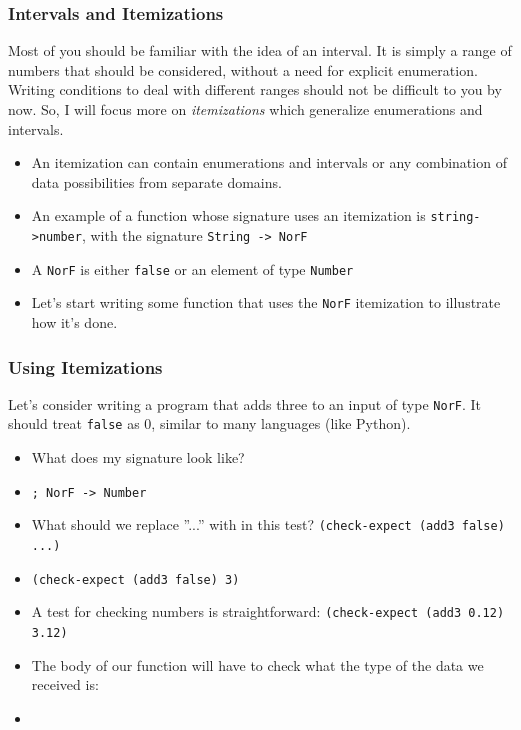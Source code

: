 \documentclass{beamer}
\begin{document}
\begin{frame}
  \frametitle{Intervals and Itemizations}
  Most of you should be familiar with the idea of an interval. It is simply
  a range of numbers that should be considered, without a need for
  explicit enumeration.
  Writing conditions to deal
  with different ranges should not be difficult to you by now. So, I will
  focus more on \emph{itemizations} which generalize enumerations and intervals.
  \begin{itemize}
  \item<2-> An itemization can contain enumerations and intervals or any
    combination of data possibilities from separate domains.
  \item<3-> An example of a function whose signature uses an
    itemization is \texttt{string->number}, with
    the signature \texttt{String -> NorF}
  \item<4-> A \texttt{NorF} is either \texttt{false}
    or an element of type \texttt{Number}
  \item<5-> Let's start writing some function that uses the \texttt{NorF} itemization to illustrate how it's done.
  \end{itemize}
\end{frame}



\begin{frame}
  \frametitle{Using Itemizations}
  Let's consider writing a program that adds three to an input
  of type \texttt{NorF}. It should treat \texttt{false}
  as 0, similar to many languages (like Python).
  \begin{itemize}
  \item<2-> What does my signature look like?
  \item<3-> \texttt{; NorF -> Number}
  \item<4-> What should we replace ''...'' with in this test?
    \texttt{(check-expect (add3 false) ...)}
  \item<5-> \texttt{(check-expect (add3 false) 3)}
  \item<6-> A test for checking numbers is straightforward:
    \texttt{(check-expect (add3 0.12) 3.12)}
  \item<7-> The body of our function will have to check what the type
    of the data we received is:
  \item<8-> \condAdd
  \end{itemize}
\end{frame}
\end{document}
